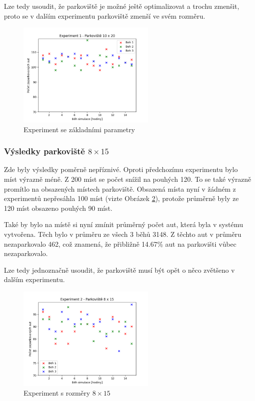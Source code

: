 \documentclass[11pt, a4paper]{article}
\begin{document}
Lze tedy usoudit, že parkoviště je možné ještě optimalizovat a trochu zmenšit, proto se v dalším experimentu parkoviště zmenší ve svém rozměru.

\begin{figure}[ht]
  \centering
  \includegraphics[width=0.6\textwidth]{img/exp1.png}
  \caption{Experiment se základními parametry}
  \label{exp1}
\end{figure}

\newpage

\subsubsection{Výsledky parkoviště \texorpdfstring{$8 \times 15$}{8 x 15}}
\label{experiment2}

Zde byly výsledky poměrně nepříznivé. Oproti předchozímu experimentu bylo míst výrazně méně. Z 200 míst se počet snížil na pouhých 120. To se také výrazně promítlo na obsazených místech parkoviště. Obsazená místa nyní v žádném z experimentů nepřesáhla 100 míst (vizte Obrázek \ref{exp2}), protože průměrně byly ze 120 míst obsazeno pouhých 90 míst.

Také by bylo na místě si nyní zmínit průměrný počet aut, která byla v systému vytvořena. Těch bylo v průměru ze všech 3 běhů 3148. Z těchto aut v průměru nezaparkovalo 462, což znamená, že přibližně 14.67\% aut na parkovišti vůbec nezaparkovalo.

Lze tedy jednoznačně usoudit, že parkoviště musí být opět o něco zvětšeno v dalším experimentu.

\begin{figure}[ht]
  \centering
  \includegraphics[width=0.6\textwidth]{img/exp2.png}
  \caption{Experiment s rozměry $8 \times 15$}
  \label{exp2}
\end{figure}
\end{document}

